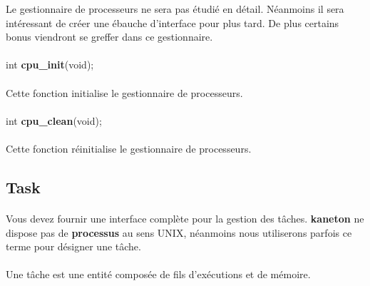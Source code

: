 \documentclass[10pt,a4wide]{article}
\begin{document}
Le gestionnaire de processeurs ne sera pas \'etudi\'e en d\'etail. N\'eanmoins
il sera int\'eressant de cr\'eer une \'ebauche d'interface pour plus tard.
De plus certains bonus viendront se greffer dans ce gestionnaire.

\paragraph{}

\hspace{1.5cm}int \textbf{cpu\_init}(void);

\paragraph{}

Cette fonction initialise le gestionnaire de processeurs.

\paragraph{}

\hspace{1.5cm}int \textbf{cpu\_clean}(void);

\paragraph{}

Cette fonction r\'einitialise le gestionnaire de processeurs.

\subsection{Task}

\paragraph{}

Vous devez fournir une interface compl\`ete pour la gestion des t\^aches.
\textbf{kaneton} ne dispose pas de \textbf{processus} au sens UNIX, n\'eanmoins
nous utiliserons parfois ce terme pour d\'esigner une t\^ache.

\paragraph{}

Une t\^ache est une entit\'e compos\'ee de fils d'ex\'ecutions et de
m\'emoire.

\paragraph{}
\end{document}
